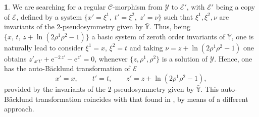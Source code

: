 \documentclass[12pt,english]{elsarticle}
\theoremstyle{plain}
\theoremstyle{plain}
\theoremstyle{remark}
\theoremstyle{plain}
\theoremstyle{definition}
\theoremstyle{definition}
\newtheorem{example}[thm]{\protect\examplename}
\providecommand{\examplename}{Example}
\begin{document}
\begin{example}
We are searching for a regular $\mathcal{C}$-morphism from
$\mathcal{Y}$ to $\mathcal{E}'$, with $\mathcal{E}'$ being a copy of
$\mathcal{E}$, defined by a system
$\{x'=\xi ^{1},\;t'=\xi ^{2},\;z'=\nu \}$ such that
$\xi ^{1},\xi ^{2},\nu $ are invariants of the $2$-pseudosymmetry given
by $\bar{\mathbb{Y}}$. Thus, being
$\{x,\,t,\,z+\ln (2\rho ^{1}\rho ^{2}-1)\}$ a basic system of zeroth order
invariants of $\bar{\mathbb{Y}}$, one is naturally lead to consider
$\xi ^{1}=x,\,\xi ^{2}=t$ and taking
$\nu =z+\ln (2\rho ^{1}\rho ^{2}-1)$ one obtains
$z'_{x't'}+{{\mathrm{e}}^{-2\,z'}}-{{\mathrm{e}}^{z'}}=0$, whenever
$\{z,\rho ^{1},\rho ^{2}\}$ is a solution of
$\mathcal{Y }$. Hence, one has the auto-B\"{a}cklund transformation
of $\mathcal{E}$
%
\begin{equation*}
x'=x,\qquad t'=t,\qquad z'=z+\ln (2\rho ^{1}\rho ^{2}-1),
\end{equation*}
%
provided by the invariants of the $2$-pseudosymmetry given by
$\bar{\mathbb{Y}}$. This auto-B\"{a}cklund transformation coincides with
that found in \cite{Brez}, by means of a different approach.
\end{example}







\end{document}
